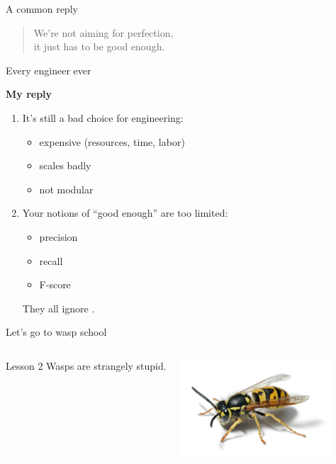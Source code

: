 \documentclass[xcolor={usenames,svgnames,x11names,dvipsnames,table}]{beamer}
\begin{document}
\begin{frame}{A common reply}
    \begin{quotation}
        We're not aiming for perfection,\\
        it just has to be good enough.
    \end{quotation}
    \hspace{14em} Every engineer ever

    \bigskip
    \textbf{My reply}
    \begin{enumerate}
        \item It's still a bad choice for engineering:
            \begin{itemize}
                \item expensive (resources, time, labor)
                \item scales badly
                \item not modular
            \end{itemize}
        \item Your notions of ``good enough'' are too limited:
            \begin{itemize}
                \item precision
                \item recall
                \item F-score
            \end{itemize}
              They all ignore .
    \end{enumerate}
\end{frame}

\begin{frame}{Let's go to wasp school}
    \begin{columns}
        \begin{alertblock}{Lesson 2}
            Wasps are strangely stupid.
        \end{alertblock}
        \includegraphics[height=10em]{./img/wasp}
    \end{columns}
    \begin{center}
    \end{center}
\end{frame}
\end{document}
